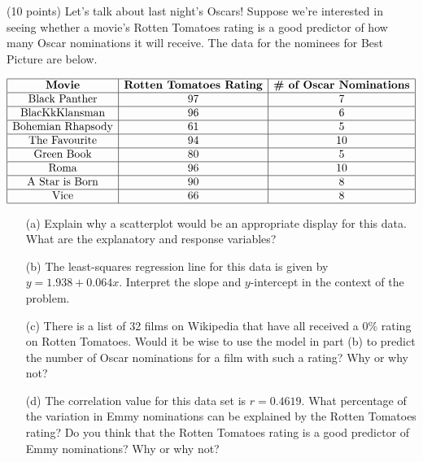\documentclass[12pt]{amsart}
\begin{document}
\begin{thm} (10 points)
Let's talk about last night's Oscars!  Suppose we're interested in seeing whether a movie's Rotten Tomatoes rating is a good predictor of how many Oscar nominations it will receive.  The data for the nominees for Best Picture are below.
\begin{center}
$\begin{array}{|c|c|c|}
\hline
\text{{\bf Movie}}&\text{\bf{Rotten Tomatoes Rating}}&\text{\bf{\# of Oscar Nominations}}\\ 
\hline
\text{Black Panther}& 97 & 7\\
\hline
\text{BlacKkKlansman}& 96 & 6\\
\hline
\text{Bohemian Rhapsody} & 61 & 5\\
\hline
\text{The Favourite} & 94 & 10\\
\hline
\text{Green Book} & 80 & 5\\
\hline
\text{Roma} & 96 & 10\\
\hline
\text{A Star is Born} & 90 & 8\\
\hline
\text{Vice} & 66 & 8\\
\hline
\end{array}$
\end{center}

\begin{itemize}
\item[(a)] Explain why a scatterplot would be an appropriate display for this data.  What are the explanatory and response variables?

\vspace{1.5in}

\item[(b)] The least-squares regression line for this data is given by $y=1.938+0.064x$.  Interpret the slope and $y$-intercept in the context of the problem.

\vspace{1in}

\item[(c)] There is a list of 32 films on Wikipedia that have all received a 0\% rating on Rotten Tomatoes.  Would it be wise to use the model in part (b) to predict the number of Oscar nominations for a film with such a rating? Why or why not?

\vspace{1in}

\item[(d)] The correlation value for this data set is $r=0.4619$.  What percentage of the variation in Emmy nominations can be explained by the Rotten Tomatoes rating? Do you think that the Rotten Tomatoes rating is a good predictor of Emmy nominations? Why or why not?
\end{itemize}
\end{thm}
\end{document}
